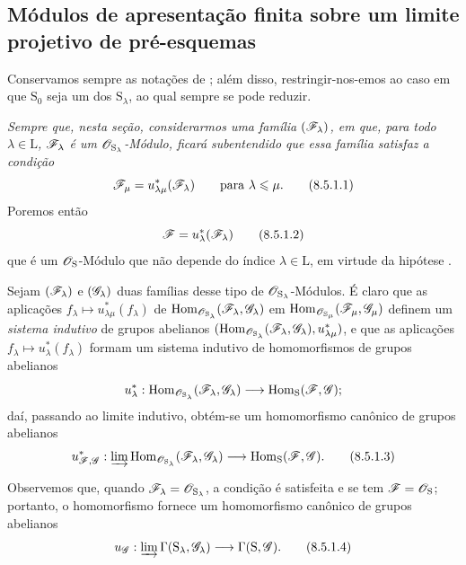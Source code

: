 \subsection{Módulos de apresentação finita sobre um limite projetivo de pré-esquemas}
\label{subsection:IV.8.5}

\begin{env}[8.5.1]
\label{IV.8.5.1}
Conservamos sempre as notações de ; além disso, restringir-nos-emos ao caso em que $\mathrm{S}_0$ seja um dos $\mathrm{S}_\lambda$, ao qual sempre se pode reduzir.

\emph{Sempre que, nesta seção, considerarmos uma família $(\mathscr{F}_\lambda)$, em que, para todo $\lambda\in\mathrm{L}$, $\mathscr{F}_\lambda$ é um $\mathscr{O}_{\mathrm{S}_\lambda}$-Módulo, ficará subentendido que essa família satisfaz a condição}
\begin{equation}
  \sh{F}_\mu=u_{\lambda\mu}^*(\sh{F}_\lambda) \qquad\text{para }\lambda\leqslant\mu.
  \tag{8.5.1.1}
\label{IV.8.5.1.1}
\end{equation}
Poremos então
\begin{equation}
  \sh{F}=u_\lambda^*(\sh{F}_\lambda)
  \label{IV.8.5.1.2}
\tag{8.5.1.2}
\end{equation}
que é um $\mathscr{O}_\mathrm{S}$-Módulo que não depende do índice $\lambda\in\mathrm{L}$, em virtude da hipótese .

Sejam $(\mathscr{F}_\lambda)$ e $(\mathscr{G}_\lambda)$ duas famílias desse tipo de $\mathscr{O}_{\mathrm{S}_\lambda}$-Módulos.
É claro que as aplicações $f_\lambda\mapsto u_{\lambda\mu}^*(f_\lambda)$ de $\operatorname{Hom}_{\mathscr{O}_{\mathrm{S}_\lambda}}(\mathscr{F}_\lambda,\mathscr{G}_\lambda)$ em $\operatorname{Hom}_{\mathscr{O}_{\mathrm{S}_\mu}}(\mathscr{F}_\mu,\mathscr{G}_\mu)$ definem um \emph{sistema indutivo} de grupos abelianos $(\operatorname{Hom}_{\mathscr{O}_{\mathrm{S}_\lambda}}(\mathscr{F}_\lambda,\mathscr{G}_\lambda),u_{\lambda\mu}^*)$, e que as aplicações $f_\lambda\mapsto u_\lambda^*(f_\lambda)$ formam um sistema indutivo de homomorfismos de grupos abelianos
\[
  u_\lambda^*:\operatorname{Hom}_{\sh{O}_{\mathrm{S}_\lambda}}(\sh{F}_\lambda,\sh{G}_\lambda)\to\operatorname{Hom}_\mathrm{S}(\sh{F},\sh{G});
\]
daí, passando ao limite indutivo, obtém-se um homomorfismo canônico de grupos abelianos
\begin{equation}
  u_{\sh{F},\sh{G}}^*:\varinjlim\operatorname{Hom}_{\sh{O}_{\mathrm{S}_\lambda}}(\sh{F}_\lambda,\sh{G}_\lambda)\to\operatorname{Hom}_\mathrm{S}(\sh{F},\sh{G}).
  \tag{8.5.1.3}
\label{IV.8.5.1.3}
\end{equation}

Observemos que, quando $\mathscr{F}_\lambda=\mathscr{O}_{\mathrm{S}_\lambda}$, a condição  é satisfeita e se tem $\mathscr{F}=\mathscr{O}_\mathrm{S}$; portanto, o homomorfismo  fornece  um homomorfismo canônico de grupos abelianos
\begin{equation}
  u_{\sh{G}}:\varinjlim\Gamma(\mathrm{S}_\lambda,\sh{G}_\lambda)\to\Gamma(\mathrm{S},\sh{G}).
  \tag{8.5.1.4}
\label{IV.8.5.1.4}
\end{equation}
\end{env}

